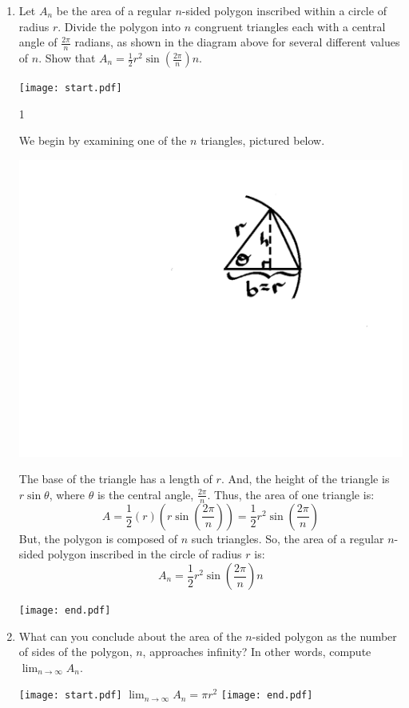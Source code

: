 \documentclass[12pt]{article}
\begin{document}
\begin{enumerate}
\begin{enumerate}
\item Let $A_n$ be the area of a regular $n$-sided polygon inscribed within a circle of radius $r$.  Divide the polygon into $n$ congruent triangles each with a central angle of $\frac{2\pi}{n}$ radians, as shown in the diagram above for several different values of $n$.    Show that $A_n=\frac{1}{2}r^2 \sin{\left(\frac{2\pi}{n}\right)} n$.

\texttt{[image: start.pdf]}
{{{1\linewidth}{We begin by examining one of the $n$ triangles, pictured below.
\begin{center}
\includegraphics[scale=0.4]{triangle.pdf}
\end{center}
The base of the triangle has a length of $r$.  And, the height of the triangle is $r\sin{\theta}$, where $\theta$ is the central angle, $\frac{2\pi}{n}$.    Thus, the area of one triangle is:
$$A=\frac{1}{2}(r)\left(r\sin{\left(\frac{2\pi}{n}\right)}\right)=\frac{1}{2}r^2\sin{\left(\frac{2\pi}{n}\right)}$$
 But, the polygon is composed of $n$ such triangles.  So, the area of a regular $n$-sided polygon inscribed in the circle of radius $r$ is: 
$$A_n=\frac{1}{2}r^2\sin{\left(\frac{2\pi}{n}\right)}n$$
}}}
\texttt{[image: end.pdf]}


\item What can you conclude about the area of the $n$-sided polygon as the number of sides of the polygon, $n$, approaches infinity?  In other words, compute $\lim_{n \rightarrow \infty}{A_n}$.

\texttt{[image: start.pdf]}
{{$\lim_{n \rightarrow \infty}{A_n}=\pi r^2$}}
\texttt{[image: end.pdf]}


\end{enumerate}


\end{enumerate}
\end{document}
